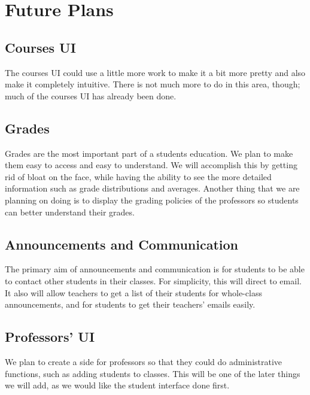 \documentclass{article}
\begin{document}
\section{Future Plans}

\subsection{Courses UI}

The courses UI could use a little more work to make it a bit more pretty and
also make it completely intuitive. There is not much more to do in this area,
though; much of the courses UI has already been done.

\subsection{Grades}

Grades are the most important part of a students education. We plan to make
them easy to access and easy to understand. We will accomplish this by getting
rid of bloat on the face, while having the ability to see the more detailed
information such as grade distributions and averages. Another thing that we are
planning on doing is to display the grading policies of the professors so
students can better understand their grades.

\subsection{Announcements and Communication}

The primary aim of announcements and communication is for students to be able
to contact other students in their classes. For simplicity, this will direct to
email. It also will allow teachers to get a list of their students for
whole-class announcements, and for students to get their teachers' emails
easily.

\subsection{Professors' UI}

We plan to create a side for professors so that they could do administrative
functions, such as adding students to classes. This will be one of the later
things we will add, as we would like the student interface done first.

{} 
\end{document}
